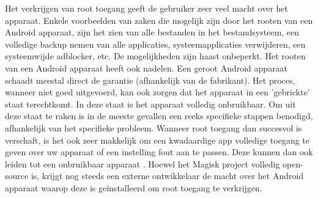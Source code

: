Het verkrijgen van root toegang geeft de gebruiker zeer veel macht over het apparaat. Enkele voorbeelden van zaken die mogelijk zijn door het rooten van een Android apparaat, zijn het zien van alle bestanden in het bestandsysteem, een volledige backup nemen van alle applicaties, systeemapplicaties verwijderen, een systeemwijde adblocker, etc. De mogelijkheden zijn haast onbeperkt. Het rooten van een Android apparaat heeft ook nadelen. Een geroot Android apparaat schaadt meestal direct de garantie (afhankelijk van de fabrikant). Het proces, wanneer niet goed uitgevoerd, kan ook zorgen dat het apparaat in een 'gebrickte' staat terechtkomt. In deze staat is het apparaat volledig onbruikbaar. Om uit deze staat te raken is in de meeste gevallen een reeks specifieke stappen benodigd, afhankelijk van het specifieke probleem. Wanneer root toegang dan succesvol is verschaft, is het ook zeer makkelijk om een kwadaardige app volledige toegang te geven over uw apparaat of een instelling fout aan te passen. Deze kunnen dan ook leiden tot een onbruikbaar apparaat \autocite{phelps_root-cons}. Hoewel het Magisk project volledig open-source is, krijgt nog steeds een externe ontwikkelaar de macht over het Android apparaat waarop deze is geïnstalleerd om root toegang te verkrijgen.
 




